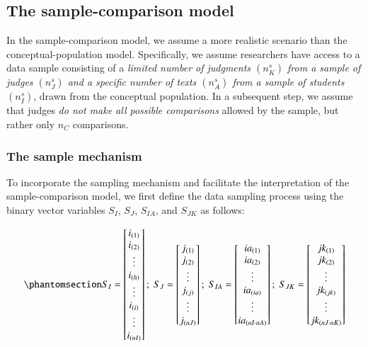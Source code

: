 \documentclass[
  authoryear,
  review,
  1p]{elsarticle}
\begin{document}
\subsection{The sample-comparison
model}\label{sec-theory-theoretical_SC}

In the sample-comparison model, we assume a more realistic scenario than
the conceptual-population model. Specifically, we assume researchers
have access to a data sample consisting of a \emph{limited number of
judgments \((n^{s}_{K})\) from a sample of judges \((n^{s}_{J})\) and a
specific number of texts \((n^{s}_{A})\) from a sample of students
\((n^{s}_{I})\)}, drawn from the conceptual population. In a subsequent
step, we assume that judges \emph{do not make all possible comparisons}
allowed by the sample, but rather only \(n_{C}\) comparisons.

\subsubsection{The sample mechanism}\label{sec-theory-theoretical_SC1}

To incorporate the sampling mechanism and facilitate the interpretation
of the sample-comparison model, we first define the data sampling
process using the binary vector variables \(S_{I}\), \(S_{J}\),
\(S_{IA}\), and \(S_{JK}\) as follows:

\begin{equation}\phantomsection\label{eq-mat21}{
S_{I} = \begin{bmatrix}
i_{(1)} \\
i_{(2)} \\
\vdots \\
i_{(h)} \\
\vdots \\
i_{(i)} \\
\vdots \\
i_{(nI)}
\end{bmatrix} ; \;
S_{J} = \begin{bmatrix}
j_{(1)} \\
j_{(2)} \\
\vdots \\
j_{(j)} \\
\vdots \\
j_{(nJ)}
\end{bmatrix} ; \;
S_{IA} = \begin{bmatrix}
ia_{(1)} \\
ia_{(2)} \\
\vdots \\
ia_{(ia)} \\
\vdots \\
ia_{(nI \cdot nA)} \\
\end{bmatrix} ; \;
S_{JK} = \begin{bmatrix}
jk_{(1)} \\
jk_{(2)} \\
\vdots \\
jk_{(jk)} \\
\vdots \\
jk_{(nJ \cdot nK)} \\
\end{bmatrix}
}\end{equation}
\end{document}

